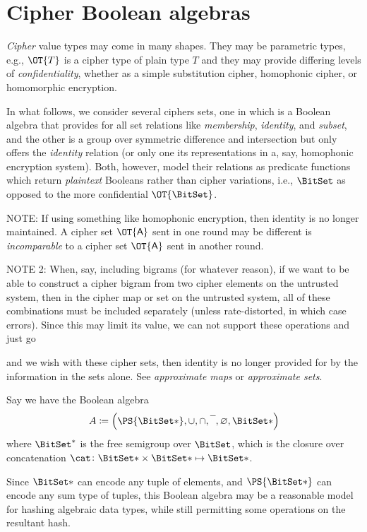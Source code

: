 \documentclass[ ../main.tex]{subfiles}
\begin{document}
\section{Cipher Boolean algebras}
\emph{Cipher} value types may come in many shapes.
They may be parametric types, e.g., $\OT{T}$ is a cipher type of plain type $T$ and they may provide differing levels of \emph{confidentiality}, whether as a simple substitution cipher, homophonic cipher, or homomorphic encryption.

In what follows, we consider several ciphers sets, one in which is a Boolean algebra that provides for all set relations like \emph{membership}, \emph{identity}, and \emph{subset}, and the other is a group over symmetric difference and intersection but only offers the \emph{identity} relation (or only one its representations in a, say, homophonic encryption system).
Both, however, model their relations as predicate functions which return \emph{plaintext} Booleans rather than cipher variations, i.e., $\BitSet$ as opposed to the more confidential $\OT{\BitSet}$.

NOTE: If using something like homophonic encryption, then identity is no longer maintained. A cipher set $\OT{\Set{A}}$ sent in one round may be different is \emph{incomparable} to a cipher set $\OT{\Set{A}}$ sent in another round. 

NOTE 2: When, say, including bigrams (for whatever reason), if we want to be able to construct a cipher bigram from two cipher elements on the untrusted system, then in the cipher map or set on the untrusted system, all of these combinations must be included separately (unless rate-distorted, in which case errors). Since this may limit its value, we can not support these operations and just go 

and we wish  with these cipher sets, then identity is no longer provided for by the information in the sets alone. See \emph{approximate maps} or \emph{approximate sets}.




Say we have the Boolean algebra
\begin{equation}
	A \coloneqq \left(\PS{\BitSet*}, \SetUnion, \SetIntersection, \SetComplement, \EmptySet, {\BitSet*}\right)
\end{equation}
where $\BitSet^*$ is the free semigroup over $\BitSet$, which is the closure over concatenation $\cat \colon {\BitSet*} \times {\BitSet*} \mapsto {\BitSet*}$.

Since $\BitSet*$ can encode any tuple of elements, and $\PS{\BitSet*}$ can encode any sum type of tuples, this Boolean algebra may be a reasonable model for hashing algebraic data types, while still permitting some operations on the resultant hash.
\end{document}

